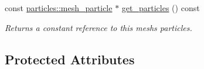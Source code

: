 \begin{DoxyCompactItemize}
\mbox{\label{classphysim_1_1meshes_1_1mesh_a689c4b1ea0b9522dd8e9564c7bbacdd2}} 
const \hyperlink{classphysim_1_1particles_1_1mesh__particle}{particles\+::mesh\+\_\+particle} $\ast$ \hyperlink{classphysim_1_1meshes_1_1mesh_a689c4b1ea0b9522dd8e9564c7bbacdd2}{get\+\_\+particles} () const
\begin{DoxyCompactList}\small\item\em Returns a constant reference to this mesh\textquotesingle{}s particles. \end{DoxyCompactList}\end{DoxyCompactItemize}
\subsection*{Protected Attributes}
